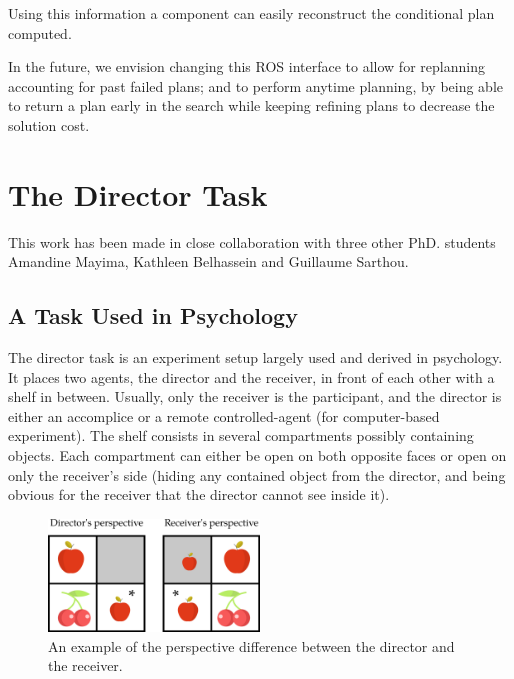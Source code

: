 \documentclass[a4paper,11pt,twoside]{StyleThese}
\begin{document}
Using this information a component can easily reconstruct the conditional plan computed.

In the future, we envision changing this ROS interface to allow for replanning accounting for past failed plans; and to perform anytime planning, by being able to return a plan early in the search while keeping refining plans to decrease the solution cost.

\section{The Director Task}
This work has been made in close collaboration with three other PhD. students Amandine Mayima, Kathleen Belhassein and Guillaume Sarthou.

\subsection{A Task Used in Psychology}
The director task is an experiment setup largely used and derived in psychology. It places two agents, the director and the receiver, in front of each other with a shelf in between. Usually, only the receiver is the participant, and the director is either an accomplice or a remote controlled-agent (for computer-based experiment). The shelf consists in several compartments possibly containing objects. Each compartment can either be open on both opposite faces or open on only the receiver's side (hiding any contained object from the director, and being obvious for the receiver that the director cannot see inside it).

\begin{figure}[hbtp]
\centering
\includegraphics[width=0.5\textwidth]{figures/chapter5/dt_apple.png}
\caption{An example of the perspective difference between the director and the receiver.}
\label{fig:chap5dtapple}
\end{figure}
\end{document}

